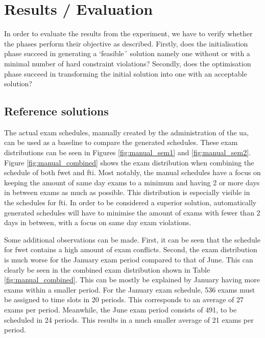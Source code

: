 
\section{Results / Evaluation}\label{sec:results}

In order to evaluate the results from the experiment, we have to verify whether the phases perform their objective as described. Firstly, does the initialisation phase succeed in generating a `feasible´ solution namely one without or with a minimal number of hard constraint violations? Secondly, does the optimisation phase succeed in transforming the initial solution into one with an acceptable solution?

\subsection{Reference solutions}

The actual exam schedules, manually created by the administration of the \acrlong{ua}, can be used as a baseline to compare the generated schedules. These exam distributions can be seen in Figures \ref{fig:manual_sem1} and \ref{fig:manual_sem2}. Figure \ref{fig:manual_combined} shows the exam distribution when combining the schedule of both \acrshort{fwet} and \acrshort{fti}. Most notably, the manual schedules have a focus on keeping the amount of same day exams to a minimum and having 2 or more days in between exams as much as possible. This distribution is especially visible in the schedules for \acrshort{fti}. In order to be considered a superior solution, automatically generated schedules will have to minimise the amount of exams with fewer than 2 days in between, with a focus on same day exam violations.

Some additional observations can be made. First, it can be seen that the schedule for \acrshort{fwet} contains a high amount of exam conflicts. Second, the exam distribution is much worse for the January exam period compared to that of June. This can clearly be seen in the combined exam distribution shown in Table \ref{fig:manual_combined}. This can be mostly be explained by January having more exams within a smaller period. For the January exam schedule, 536 exams must be assigned to time slots in 20 periods. This corresponds to an average of 27 exams per period. Meanwhile, the June exam period consists of 491, to be scheduled in 24 periods. This results in a much smaller average of 21 exams per period.

